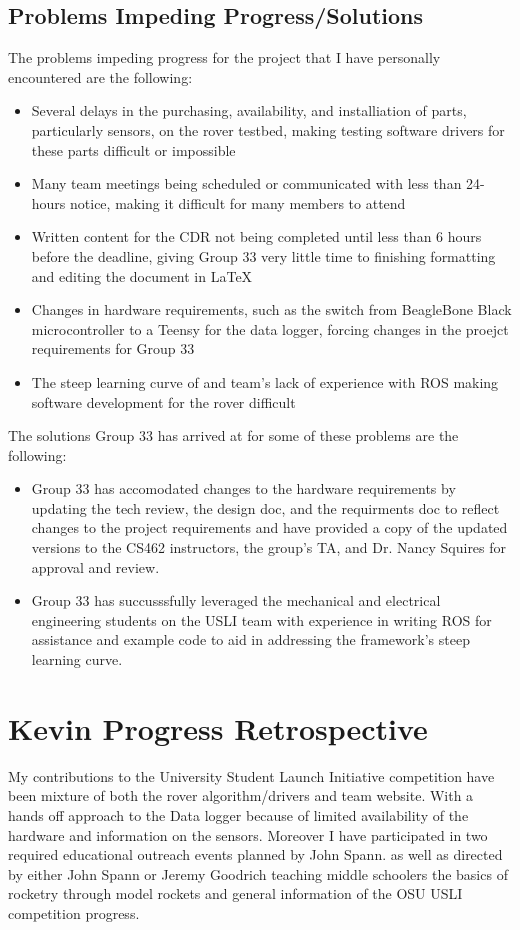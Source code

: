 \documentclass[onecolumn, draftclsnofoot,10pt, compsoc]{IEEEtran}
\begin{document}
\subsection{Problems Impeding Progress/Solutions}
The problems impeding progress for the project that I have personally encountered are the following:
\begin{itemize}
\item Several delays in the purchasing, availability, and installiation of parts, particularly sensors, on the rover testbed, making testing software drivers for these parts difficult or impossible
\item Many team meetings being scheduled or communicated with less than 24-hours notice, making it difficult for many members to attend
\item Written content for the CDR not being completed until less than 6 hours before the deadline, giving Group 33 very little time to finishing formatting and editing the document in \LaTeX
\item Changes in hardware requirements, such as the switch from BeagleBone Black microcontroller to a Teensy for the data logger, forcing changes in the proejct requirements for Group 33
\item The steep learning curve of and team's lack of experience with ROS making software development for the rover difficult 
\end{itemize}

The solutions Group 33 has arrived at for some of these problems are the following:
\begin{itemize}
\item Group 33 has accomodated changes to the hardware requirements by updating the tech review, the design doc, and the requirments doc to reflect changes to the project requirements and have provided a copy of the updated versions to the CS462 instructors, the group's TA, and Dr. Nancy Squires for approval and review.
\item Group 33 has succusssfully leveraged the mechanical and electrical engineering students on the USLI team with experience in writing ROS for assistance and example code to aid in addressing the framework's steep learning curve.
\end{itemize}

\section{Kevin Progress Retrospective}
My contributions to the University Student Launch Initiative competition have been mixture of both the rover algorithm/drivers and team website. With a hands off approach to the Data logger because of limited availability of the hardware and information on the sensors. Moreover I have participated in two required educational outreach events planned by John Spann. as well as directed by either John Spann or Jeremy Goodrich teaching middle schoolers the basics of rocketry through model rockets and general information of the OSU USLI competition progress.\par
\end{document}
